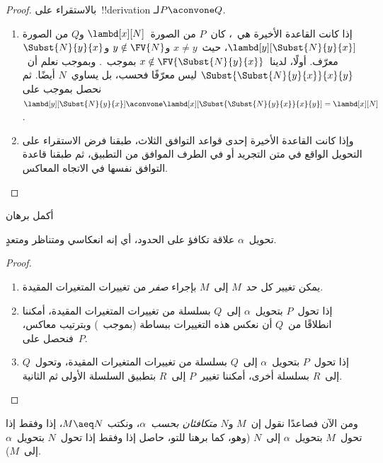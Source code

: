 \documentclass[../../../include/open-logic-section]{subfiles}
\begin{document}
\begin{proof}
  بالاستقراء على~!!{derivation} لـ$P \aconvone Q$.
  \begin{enumerate}
  \item إذا كانت القاعدة الأخيرة هي~، كان~$P$ من
    الصورة~$\lambd[x][N]$ و$Q$ من الصورة
    $\lambd[y][\Subst{N}{y}{x}]$، حيث~$x \neq y$ و$y \notin \FV{N}$
    و$\Subst{N}{y}{x}$ معرّف. أولًا، لدينا~$x \notin
    \FV{\Subst{N}{y}{x}}$ بموجب~. وبموجب
     نعلم أن~$\Subst{\Subst{N}{y}{x}}{x}{y}$ ليس
    معرّفًا فحسب، بل يساوي~$N$ أيضًا. ثم نحصل بموجب
     على~$\lambd[y][\Subst{N}{y}{x}]
    \aconvone \lambd[x][\Subst{\Subst{N}{y}{x}}{x}{y}] =
    \lambd[x][N]$.
  \item وإذا كانت القاعدة الأخيرة إحدى قواعد التوافق الثلاث، طبقنا فرض
    الاستقراء على التحويل الواقع في متن التجريد أو في الطرف الموافق من
    التطبيق، ثم طبقنا قاعدة التوافق نفسها في الاتجاه المعاكس.
  \end{enumerate}
\end{proof}

\begin{prob}
  أكمل برهان~
\end{prob}

\begin{thm}
  تحويل~$\alpha$ علاقة تكافؤ على الحدود، أي إنه انعكاسي ومتناظر ومتعدٍ.
\end{thm}

\begin{proof}
  \begin{enumerate}
  \item يمكن تغيير كل حد~$M$ إلى~$M$ بإجراء \emph{صفر} من تغييرات
    المتغيرات المقيدة.
  \item إذا تحول~$P$ بتحويل~$\alpha$ إلى~$Q$ بسلسلة من تغييرات
    المتغيرات المقيدة، أمكننا انطلاقًا من~$Q$ أن نعكس هذه التغييرات
    ببساطة (بموجب~) وبترتيب معاكس، فنحصل على~$P$.
  \item إذا تحول~$P$ بتحويل~$\alpha$ إلى~$Q$ بسلسلة من تغييرات
    المتغيرات المقيدة، وتحول~$Q$ إلى~$R$ بسلسلة أخرى، أمكننا تغيير~$P$
    إلى~$R$ بتطبيق السلسلة الأولى ثم الثانية.
  \end{enumerate}
\end{proof}

ومن الآن فصاعدًا نقول إن~$M$ و$N$ \emph{متكافئان بحسب~$\alpha$}، ونكتب
$M \aeq N$، إذا وفقط إذا تحول~$M$ بتحويل~$\alpha$ إلى~$N$ (وهو، كما
برهنا للتو، حاصل إذا وفقط إذا تحول~$N$ بتحويل~$\alpha$ إلى~$M$).
\end{document}

